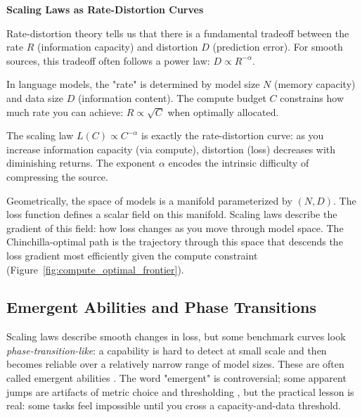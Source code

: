 \begin{geometrylens}
\textbf{Scaling Laws as Rate-Distortion Curves}

\vspace{0.5em}

Rate-distortion theory tells us that there is a fundamental tradeoff between the rate $R$ (information capacity) and distortion $D$ (prediction error). For smooth sources, this tradeoff often follows a power law: $D \propto R^{-\alpha}$.

\vspace{0.5em}

In language models, the "rate" is determined by model size $N$ (memory capacity) and data size $D$ (information content). The compute budget $C$ constrains how much rate you can achieve: $R \propto \sqrt{C}$ when optimally allocated.

\vspace{0.5em}

The scaling law $L(C) \propto C^{-\alpha}$ is exactly the rate-distortion curve: as you increase information capacity (via compute), distortion (loss) decreases with diminishing returns. The exponent $\alpha$ encodes the intrinsic difficulty of compressing the source.

\vspace{0.5em}

Geometrically, the space of models is a manifold parameterized by $(N, D)$. The loss function defines a scalar field on this manifold. Scaling laws describe the gradient of this field: how loss changes as you move through model space. The Chinchilla-optimal path is the trajectory through this space that descends the loss gradient most efficiently given the compute constraint (Figure~\ref{fig:compute_optimal_frontier}).
\end{geometrylens}

\vspace{1.5em}

\subsection{Emergent Abilities and Phase Transitions}

Scaling laws describe smooth changes in loss, but some benchmark curves look \emph{phase-transition-like}: a capability is hard to detect at small scale and then becomes reliable over a relatively narrow range of model sizes. These are often called emergent abilities \citep{wei2022emergent}. The word "emergent" is controversial; some apparent jumps are artifacts of metric choice and thresholding \citep{schaeffer2023emergentmirage}, but the practical lesson is real: some tasks feel impossible until you cross a capacity-and-data threshold.

